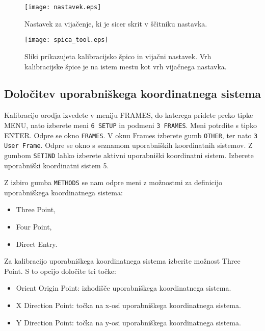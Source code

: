 \begin{figure}[!hbt]
	\centering
	\texttt{[image: nastavek.eps]}
	\caption{Nastavek za vijačenje, ki je sicer skrit v ščitniku nastavka.}
	\label{fig:nastavek}
\end{figure}

\begin{figure}[!hbt]
	\centering
	\texttt{[image: spica\_tool.eps]}
	\caption{Sliki prikazujeta kalibracijsko špico in vijačni nastavek. Vrh kalibracijske špice je na istem mestu kot vrh vijačnega nastavka.}
	\label{fig:orodje}
\end{figure}

\newpage

\subsection{Določitev uporabniškega koordinatnega sistema} \label{pog:UF}
Kalibracijo orodja izvedete v meniju FRAMES, do katerega pridete preko tipke MENU, nato izberete meni \verb|6 SETUP| in podmeni \verb|3 FRAMES|. Meni potrdite s tipko ENTER. Odpre se okno \verb|FRAMES|. V oknu Frames izberete gumb \verb|OTHER|, ter nato \verb|3 User Frame|. Odpre se okno s seznamom uporabniških koordinatnih sistemov. Z gumbom \verb|SETIND| lahko izberete aktivni uporabniški koordinatni sistem. Izberete uporabniški koordinatni sistem 5.
 
Z izbiro gumba \verb|METHODS| se nam odpre meni z možnostmi za definicijo uporabniškega koordinatnega sistema:

\begin{itemize}
	\item Three Point,
	\item Four Point,
	\item Direct Entry.
\end{itemize}

Za kalibracijo uporabniškega koordinatnega sistema izberite možnost Three Point. S to opcijo določite tri točke:

\begin{itemize}
	\item Orient Origin Point: izhodišče uporabniškega koordinatnega sistema.
	\item X Direction Point: točka na x-osi uporabniškega koordinatnega sistema.
	\item Y Direction Point: točka na y-osi uporabniškega koordinatnega sistema.
\end{itemize}

